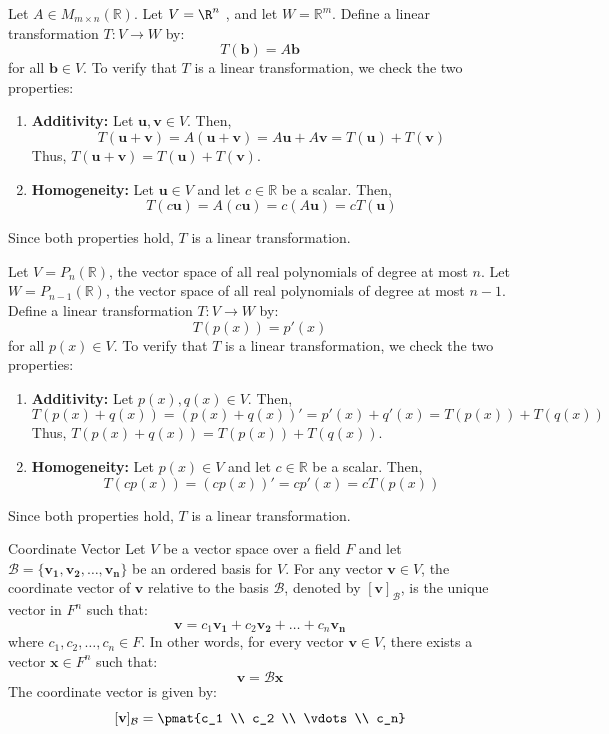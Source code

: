 \documentclass[openany]{book}
\begin{document}
\begin{example}
    Let $A \in M_{m\times n}(\mathbb{R})$. Let $V = \R^n$ , and let $W = \mathbb{R}^m$. Define a linear transformation $T: V \to W$ by:
    $$T(\mathbf{b}) = A\mathbf{b}$$
    for all $\mathbf{b} \in V$. To verify that $T$ is a linear transformation, we check the two properties:
    \begin{enumerate}
        \item \textbf{Additivity:} Let $\mathbf{u}, \mathbf{v} \in V$. Then,
        \[
        T(\mathbf{u} + \mathbf{v}) = A(\mathbf{u} + \mathbf{v}) = A\mathbf{u} + A\mathbf{v} = T(\mathbf{u}) + T(\mathbf{v})
        \]
        Thus, $T(\mathbf{u} + \mathbf{v}) = T(\mathbf{u}) + T(\mathbf{v})$.

        \item \textbf{Homogeneity:} Let $\mathbf{u} \in V$ and let $c \in \mathbb{R}$ be a scalar. Then,
        \[
        T(c\mathbf{u}) = A(c\mathbf{u}) = c(A\mathbf{u}) = cT(\mathbf{u})
        \]
    \end{enumerate}
    Since both properties hold, $T$ is a linear transformation.
\end{example}
\begin{example}
    Let $V = P_n(\mathbb{R})$, the vector space of all real polynomials of degree at most $n$. Let $W = P_{n-1}(\mathbb{R})$, the vector space of all real polynomials of degree at most $n-1$. Define a linear transformation $T: V \to W$ by:
    $$T(p(x)) = p'(x)$$
    for all $p(x) \in V$. To verify that $T$ is a linear transformation, we check the two properties:
    \begin{enumerate}
        \item \textbf{Additivity:} Let $p(x), q(x) \in V$. Then,
        \[
        T(p(x) + q(x)) = (p(x) + q(x))' = p'(x) + q'(x) = T(p(x)) + T(q(x))
        \]
        Thus, $T(p(x) + q(x)) = T(p(x)) + T(q(x))$.

        \item \textbf{Homogeneity:} Let $p(x) \in V$ and let $c \in \mathbb{R}$ be a scalar. Then,
        \[
        T(cp(x)) = (cp(x))' = c p'(x) = cT(p(x))
        \]
    \end{enumerate}
    Since both properties hold, $T$ is a linear transformation.
\end{example}
\begin{mydefinition}{Coordinate Vector}
    Let $V$ be a vector space over a field $F$ and let $\mathcal{B} = \{\mathbf{v_1}, \mathbf{v_2}, \ldots, \mathbf{v_n}\}$ be an ordered basis for $V$. For any vector $\mathbf{v} \in V$, the coordinate vector of $\mathbf{v}$ relative to the basis $\mathcal{B}$, denoted by $[\mathbf{v}]_{\mathcal{B}}$, is the unique vector in $F^n$ such that:
    $$\mathbf{v} = c_1 \mathbf{v_1} + c_2 \mathbf{v_2} + \ldots + c_n \mathbf{v_n}$$
    where $c_1, c_2, \ldots, c_n \in F$. In other words, for every vector $\mathbf{v} \in V$, there exists a vector $\mathbf{x} \in F^n$ such that: 
    $$\mathbf{v} = \mathcal{B}\mathbf{x}$$ 
    The coordinate vector is given by:
    $$[\mathbf{v}]_{\mathcal{B}} = \pmat{c_1 \\ c_2 \\ \vdots \\ c_n}$$
\end{mydefinition}
\end{document}
